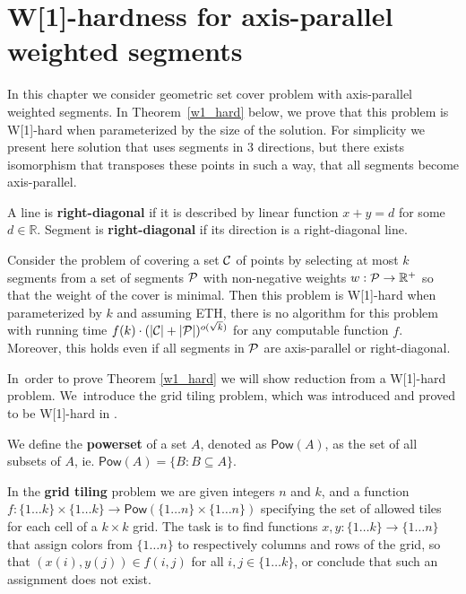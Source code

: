 \chapter{W[1]-hardness for axis-parallel weighted segments}
\label{chapter:w1_hard}

In this chapter we consider geometric set cover problem with 
axis-parallel weighted segments.
In Theorem~\ref{w1_hard} below, we prove that this problem is 
W[1]-hard when parameterized by the size of the solution.
For simplicity we present here solution that uses segments in
3 directions, but there exists isomorphism that transposes
these points in such a way, that all segments become axis-parallel.

\begin{defi}
	A line is \textbf{right-diagonal} if it is
	described by linear function $x + y = d$ for some $d \in \mathbb{R}$.
	Segment is \textbf{right-diagonal} if its
	direction is a right-diagonal line.
\end{defi}

\begin{tw}
\label{w1_hard}
	Consider the problem of covering a set $\mathcal{C}$ of points
	by selecting at most $k$ segments
	from a set of segments $\mathcal{P}$ 
	with non-negative weights $w : \mathcal{P} \rightarrow \mathbb{R^+}$
	so that the weight of the cover is minimal.
	Then this problem is W[1]-hard when parameterized by $k$ and
	assuming ETH, there is no algorithm for this
	problem with running time
	$f(k)\cdot(|\mathcal{C}| + |\mathcal{P}|)^{o(\sqrt{k})}$
	for any computable function $f$.
	Moreover, this holds even if all segments in $\mathcal{P}$
	are axis-parallel or right-diagonal.
\end{tw}

In~order to prove Theorem \ref{w1_hard}
we will show reduction from a W[1]-hard problem.
We~introduce the grid tiling problem,
which was introduced and proved to be W[1]-hard in \cite{marx_grid_tiling}.

\newcommand{\pow}{\mathsf{Pow}}

\begin{defi}
We define the \textbf{powerset} of a set $A$, denoted as $\pow(A)$,
as the set of all subsets of $A$, ie. $\pow(A) = \{B : B \subseteq A\}$.
\end{defi}

\begin{defi}
In the \textbf{grid tiling} problem we are given integers $n$ and $k$,
and a function
$f : \{1 \ldots k\} \times \{1 \ldots k\} \rightarrow \pow(\{1 \ldots n\} \times \{1 \ldots n\})$
specifying the set of allowed tiles for each cell of a $k \times k$ grid.
The task is to find functions
$x,y : \{1 \ldots k\} \rightarrow \{1 \ldots n\}$
that assign colors from $\{1 \ldots n\}$
to respectively columns and rows of the grid,
so that $(x(i), y(j)) \in f(i, j)$ for all $i,j \in \{1 \ldots k\}$,
or conclude that such an assignment does not exist.
\end{defi}

